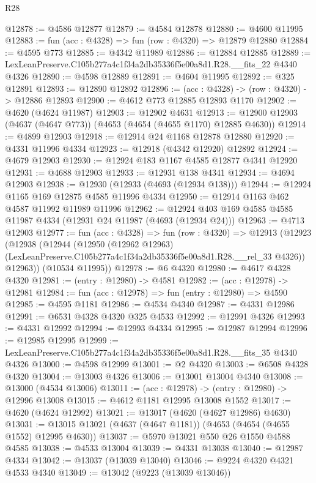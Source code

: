\begin{lexlean}{R28}
\begin{coremodule}
@12878 := @4586 @12877
@12879 := @4584 @12878
@12880 := @4600 @11995
@12883 := fun (acc : @4328) => fun (row : @4320) => @12879 @12880
@12884 := @4595 @773
@12885 := @4342 @11989
@12886 := @12884 @12885
@12889 := LexLeanPreserve.C105b277a4c1f34a2db35336f5e00a8d1.R28.__fits_22 @4340 @4326
@12890 := @4598 @12889
@12891 := @4604 @11995
@12892 := @325 @12891
@12893 := @12890 @12892
@12896 := (acc : @4328) -> (row : @4320) -> @12886 @12893
@12900 := @4612 @773 @12885 @12893 @1170
@12902 := @4620 (@4624 @11987)
@12903 := @12902 @4631
@12913 := @12900 @12903 (@4637 (@4647 @773)) (@4653 (@4654 (@4655 @1170) @12885 @4630))
@12914 := @4899 @12903
@12918 := @12914 @24 @1168 @12878 @12880
@12920 := @4331 @11996 @4334
@12923 := @12918 (@4342 @12920) @12892
@12924 := @4679 @12903
@12930 := @12924 @183 @1167 @4585 @12877 @4341 @12920
@12931 := @4688 @12903
@12933 := @12931 @138 @4341
@12934 := @4694 @12903
@12938 := @12930 (@12933 (@4693 (@12934 @138)))
@12944 := @12924 @1165 @169 @12875 @4585 @11996 @4334
@12950 := @12914 @1163 @462 @4587 @11992 @11989 @11996
@12962 := @12924 @403 @169 @4585 @4585 @11987 @4334 (@12931 @24 @11987 (@4693 (@12934 @24)))
@12963 := @4713 @12903
@12977 := fun (acc : @4328) =>
  fun (row : @4320) =>
  @12913
    (@12923
      (@12938
        (@12944
          (@12950
            (@12962 @12963)
            (LexLeanPreserve.C105b277a4c1f34a2db35336f5e00a8d1.R28.__rel_33 @4326))
          @12963))
      (@10534 @11995))
@12978 := @6 @4320
@12980 := @4617 @4328 @4320
@12981 := (entry : @12980) -> @4581
@12982 := (acc : @12978) -> @12981
@12984 := fun (acc : @12978) => fun (entry : @12980) => @4590
@12985 := @4595 @1181
@12986 := @4534 @4340
@12987 := @4331 @12986
@12991 := @6531 @4328 @4320 @325 @4533
@12992 := @12991 @4326
@12993 := @4331 @12992
@12994 := @12993 @4334
@12995 := @12987 @12994
@12996 := @12985 @12995
@12999 := LexLeanPreserve.C105b277a4c1f34a2db35336f5e00a8d1.R28.__fits_35 @4340 @4326
@13000 := @4598 @12999
@13001 := @2 @4320
@13003 := @6508 @4328 @4320
@13004 := @13003 @4326
@13006 := @13001 @13004 @4340
@13008 := @13000 (@4534 @13006)
@13011 := (acc : @12978) -> (entry : @12980) -> @12996 @13008
@13015 := @4612 @1181 @12995 @13008 @1552
@13017 := @4620 (@4624 @12992)
@13021 := @13017 (@4620 (@4627 @12986) @4630)
@13031 := @13015 @13021 (@4637 (@4647 @1181)) (@4653 (@4654 (@4655 @1552) @12995 @4630))
@13037 := @5970 @13021 @550 @26 @1550 @4588 @4585
@13038 := @4533 @13004
@13039 := @4331 @13038
@13040 := @12987 @4334
@13042 := @13037 (@13039 @13040)
@13046 := @9224 @4320 @4321 @4533 @4340
@13049 := @13042 (@9223 (@13039 @13046))

\end{coremodule}
\end{lexlean}

